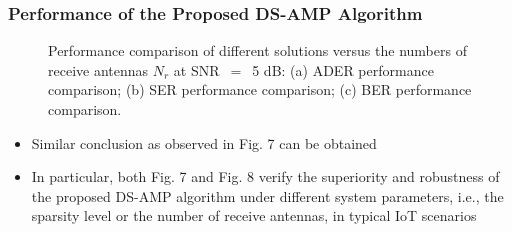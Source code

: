 \documentclass[9pt]{beamer}
\begin{document}
\begin{frame}
\frametitle{Performance of the Proposed DS-AMP Algorithm}
\begin{figure}[h]
\centering
{}%
%
%
\centering
\setlength{\abovecaptionskip}{-1mm}
\caption{Performance comparison of different solutions versus the numbers of receive antennas $N_r$ at SNR~$=$~5 dB: (a) ADER performance comparison; (b) SER performance comparison; (c) BER performance comparison. }
\label{fig:SNR}
\vspace{-5mm}
\end{figure}
\begin{itemize}
\item
Similar conclusion as observed in Fig. 7 can be obtained
\item
In particular, both Fig. 7 and Fig. 8 verify the superiority and robustness of the proposed DS-AMP algorithm under different system parameters, i.e., the sparsity level or the number of receive antennas, in typical IoT scenarios
\end{itemize}
\end{frame}
\end{document}
